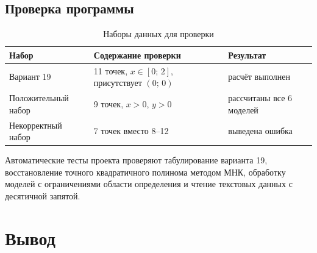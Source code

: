 \documentclass[12pt,a4paper]{article}
\begin{document}
\subsection{Проверка программы}

\begin{table}[H]
  \centering
  \caption{Наборы данных для проверки}
  \begin{tabular}{C{4cm}C{6.2cm}C{3.2cm}}
    \toprule
    \textbf{Набор} & \textbf{Содержание проверки} & \textbf{Результат} \\
    \midrule
    Вариант 19 & 11 точек, $x\in[0;\,2]$, присутствует $(0;\,0)$ & расчёт выполнен \\
    Положительный набор & 9 точек, $x>0$, $y>0$ & рассчитаны все 6 моделей \\
    Некорректный набор & 7 точек вместо 8--12 & выведена ошибка \\
    \bottomrule
  \end{tabular}
\end{table}

Автоматические тесты проекта проверяют табулирование варианта 19, восстановление точного
квадратичного полинома методом МНК, обработку моделей с ограничениями области определения
и чтение текстовых данных с десятичной запятой.

\section{Вывод}
\end{document}
